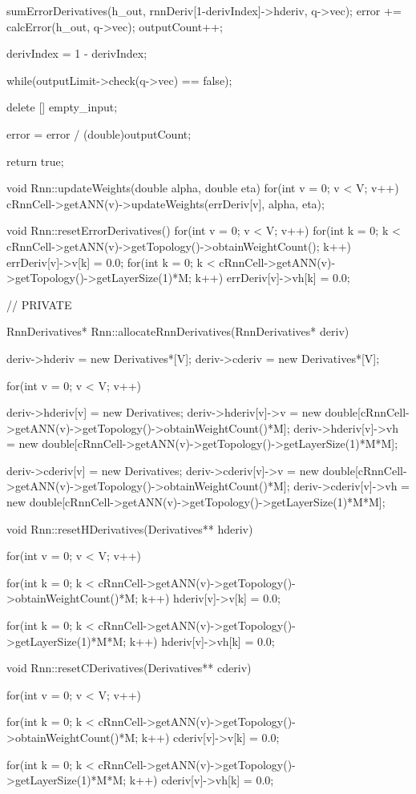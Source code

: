 {{     sumErrorDerivatives(h\_out, rnnDeriv[1-derivIndex]->hderiv, q->vec);
     error += calcError(h\_out, q->vec);
     outputCount++;

     derivIndex = 1 - derivIndex;

   }while(outputLimit->check(q->vec) == false);


   delete [] empty\_input;

   error = error / (double)outputCount;

   return true;

}

void Rnn::updateWeights(double alpha, double eta){
  for(int v = 0; v < V; v++)
    cRnnCell->getANN(v)->updateWeights(errDeriv[v], alpha, eta);
}

void Rnn::resetErrorDerivatives(){
  for(int v = 0; v < V; v++){
    for(int k = 0; k < cRnnCell->getANN(v)->getTopology()->obtainWeightCount(); k++)
      errDeriv[v]->v[k] = 0.0;
    for(int k = 0; k < cRnnCell->getANN(v)->getTopology()->getLayerSize(1)*M; k++)
      errDeriv[v]->vh[k] = 0.0;
  }
}


// PRIVATE


RnnDerivatives* Rnn::allocateRnnDerivatives(RnnDerivatives* deriv){
  deriv->hderiv = new Derivatives*[V];
  deriv->cderiv = new Derivatives*[V];

  for(int v = 0; v < V; v++){
    deriv->hderiv[v] = new Derivatives;
    deriv->hderiv[v]->v = new double[cRnnCell->getANN(v)->getTopology()->obtainWeightCount()*M];
    deriv->hderiv[v]->vh = new double[cRnnCell->getANN(v)->getTopology()->getLayerSize(1)*M*M];

    deriv->cderiv[v] = new Derivatives;
    deriv->cderiv[v]->v = new double[cRnnCell->getANN(v)->getTopology()->obtainWeightCount()*M];
    deriv->cderiv[v]->vh = new double[cRnnCell->getANN(v)->getTopology()->getLayerSize(1)*M*M];
  }
}


void Rnn::resetHDerivatives(Derivatives** hderiv){
  for(int v = 0; v < V; v++){
    for(int k = 0; k < cRnnCell->getANN(v)->getTopology()->obtainWeightCount()*M; k++)
      hderiv[v]->v[k] = 0.0;

    for(int k = 0; k < cRnnCell->getANN(v)->getTopology()->getLayerSize(1)*M*M; k++)
      hderiv[v]->vh[k] = 0.0;

  }
}
void Rnn::resetCDerivatives(Derivatives** cderiv){
  for(int v = 0; v < V; v++){
    for(int k = 0; k < cRnnCell->getANN(v)->getTopology()->obtainWeightCount()*M; k++)
      cderiv[v]->v[k] = 0.0;

    for(int k = 0; k < cRnnCell->getANN(v)->getTopology()->getLayerSize(1)*M*M; k++)
      cderiv[v]->vh[k] = 0.0;

  }
}


